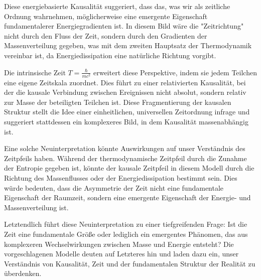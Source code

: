 \documentclass[a4paper,12pt]{article}
\begin{document}
			Diese energiebasierte Kausalität suggeriert, dass das, was wir als zeitliche Ordnung wahrnehmen, möglicherweise eine emergente Eigenschaft fundamentalerer Energiegradienten ist. In diesem Bild wäre die "Zeitrichtung" nicht durch den Fluss der Zeit, sondern durch den Gradienten der Massenverteilung gegeben, was mit dem zweiten Hauptsatz der Thermodynamik vereinbar ist, da Energiedissipation eine natürliche Richtung vorgibt.
			
			Die intrinsische Zeit \( T = \frac{\hbar}{m c^2} \) erweitert diese Perspektive, indem sie jedem Teilchen eine eigene Zeitskala zuordnet. Dies führt zu einer relativierten Kausalität, bei der die kausale Verbindung zwischen Ereignissen nicht absolut, sondern relativ zur Masse der beteiligten Teilchen ist. Diese Fragmentierung der kausalen Struktur stellt die Idee einer einheitlichen, universellen Zeitordnung infrage und suggeriert stattdessen ein komplexeres Bild, in dem Kausalität massenabhängig ist.
			
			Eine solche Neuinterpretation könnte Auswirkungen auf unser Verständnis des Zeitpfeils haben. Während der thermodynamische Zeitpfeil durch die Zunahme der Entropie gegeben ist, könnte der kausale Zeitpfeil in diesem Modell durch die Richtung des Massenflusses oder der Energiedissipation bestimmt sein. Dies würde bedeuten, dass die Asymmetrie der Zeit nicht eine fundamentale Eigenschaft der Raumzeit, sondern eine emergente Eigenschaft der Energie- und Massenverteilung ist.
			
			Letztendlich führt diese Neuinterpretation zu einer tiefgreifenden Frage: Ist die Zeit eine fundamentale Größe oder lediglich ein emergentes Phänomen, das aus komplexeren Wechselwirkungen zwischen Masse und Energie entsteht? Die vorgeschlagenen Modelle deuten auf Letzteres hin und laden dazu ein, unser Verständnis von Kausalität, Zeit und der fundamentalen Struktur der Realität zu überdenken.
			
		
\end{document}
